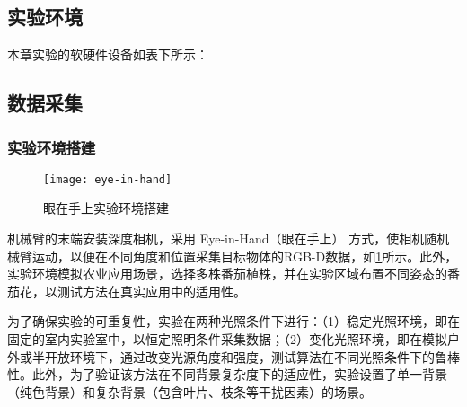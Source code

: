 \subsection{实验环境}
本章实验的软硬件设备如表下所示：
\begin{table}[htbp]
	\caption[对称空间位姿重建实验环境]{对称空间位姿重建实验环境}
	\label{tab:spacerebuild}
\end{table}

\subsection{数据采集}
\subsubsection{实验环境搭建}
 \begin{figure}[htb]
	\texttt{[image: eye-in-hand]}
	\caption[眼在手上实验环境搭建]{眼在手上实验环境搭建} %
	\label{eye-in-hand}
\end{figure}
机械臂的末端安装深度相机，采用 Eye-in-Hand（眼在手上） 方式，使相机随机械臂运动，以便在不同角度和位置采集目标物体的RGB-D数据，如\cref{eye-in-hand}所示。此外，实验环境模拟农业应用场景，选择多株番茄植株，并在实验区域布置不同姿态的番茄花，以测试方法在真实应用中的适用性。

为了确保实验的可重复性，实验在两种光照条件下进行：（1）稳定光照环境，即在固定的室内实验室中，以恒定照明条件采集数据；（2）变化光照环境，即在模拟户外或半开放环境下，通过改变光源角度和强度，测试算法在不同光照条件下的鲁棒性。此外，为了验证该方法在不同背景复杂度下的适应性，实验设置了单一背景（纯色背景）和复杂背景（包含叶片、枝条等干扰因素）的场景。

